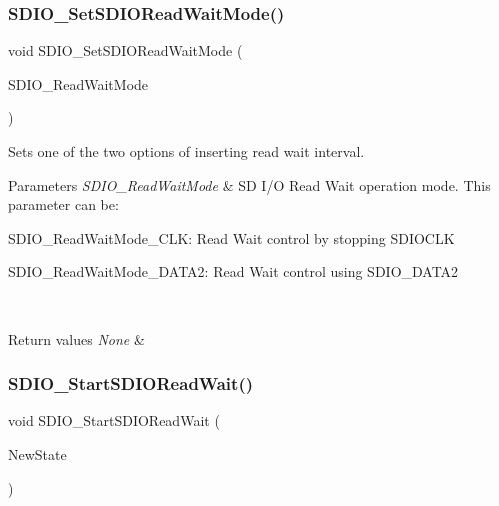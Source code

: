 \subsubsection{\texorpdfstring{SDIO\_SetSDIOReadWaitMode()}{SDIO\_SetSDIOReadWaitMode()}}
{\footnotesize\ttfamily void S\+D\+I\+O\+\_\+\+Set\+S\+D\+I\+O\+Read\+Wait\+Mode (\begin{DoxyParamCaption}\item[{uint32\+\_\+t}]{S\+D\+I\+O\+\_\+\+Read\+Wait\+Mode }\end{DoxyParamCaption})}



Sets one of the two options of inserting read wait interval. 


\begin{DoxyParams}{Parameters}
{\em S\+D\+I\+O\+\_\+\+Read\+Wait\+Mode} & SD I/O Read Wait operation mode. This parameter can be\+: \begin{DoxyItemize}
\item S\+D\+I\+O\+\_\+\+Read\+Wait\+Mode\+\_\+\+C\+LK\+: Read Wait control by stopping S\+D\+I\+O\+C\+LK \item S\+D\+I\+O\+\_\+\+Read\+Wait\+Mode\+\_\+\+D\+A\+T\+A2\+: Read Wait control using S\+D\+I\+O\+\_\+\+D\+A\+T\+A2 \end{DoxyItemize}
\\
\hline
\end{DoxyParams}

\begin{DoxyRetVals}{Return values}
{\em None} & \\
\hline
\end{DoxyRetVals}
\mbox{\label{group___s_d_i_o___private___functions_gac88f914d9a68a83abc2265ec8a7b79fc}} 
\subsubsection{\texorpdfstring{SDIO\_StartSDIOReadWait()}{SDIO\_StartSDIOReadWait()}}
{\footnotesize\ttfamily void S\+D\+I\+O\+\_\+\+Start\+S\+D\+I\+O\+Read\+Wait (\begin{DoxyParamCaption}\item[{\mbox{\hyperlink{group___exported__types_gac9a7e9a35d2513ec15c3b537aaa4fba1}{Functional\+State}}}]{New\+State }\end{DoxyParamCaption})}



